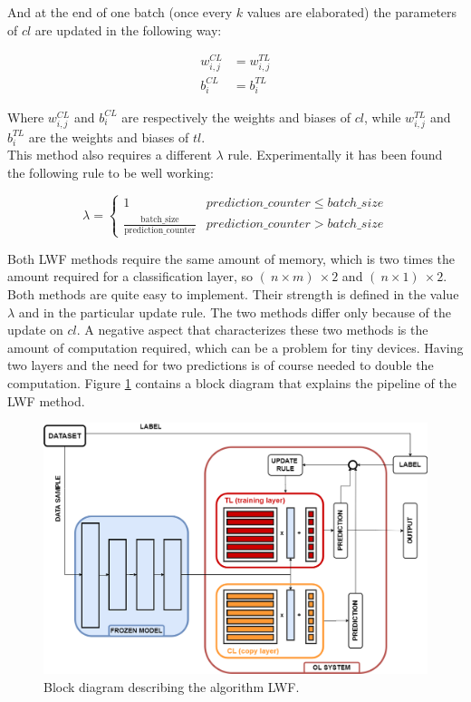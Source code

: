 \documentclass[12pt]{report}
\begin{document}
And at the end of one batch (once every $k$ values are elaborated) the parameters of $cl$ are updated in the following way:

\begin{align}
	w^{CL}_{i,j} &= w^{TL}_{i,j}  \\
	b^{CL}_i     &= b^{TL}_i  
\end{align}

Where $w^{CL}_{i,j}$ and $b^{CL}_i$ are respectively the weights and biases of $cl$, while $w^{TL}_{i,j}$ and $b^{TL}_i$ are the weights and biases of $tl$.\\
This method also requires a different $\lambda$ rule. Experimentally it has been found the following rule to be well working:

\begin{equation}
\lambda = \left\{
        		\begin{array}{ll}
            		1                                                         & prediction \_ counter \leq batch \_ size \\
            		\frac{\text{batch$\_$size}}{\text{prediction$\_$counter}} & prediction \_ counter >    batch \_ size
        		\end{array}
    		  \right.
\end{equation}

Both LWF methods require the same amount of memory, which is two times the amount required for a classification layer, so $(\ n \times m )\ \times 2$ and $(\ n \times 1 )\ \times 2$. Both methods are quite easy to implement. Their strength is defined in the value $\lambda$ and in the particular update rule. The two methods differ only because of the update on $cl$. A negative aspect that characterizes these two methods is the amount of computation required, which can be a problem for tiny devices. Having two layers and the need for two predictions is of course needed to double the computation. Figure \ref{fig:block_diag_LWF} contains a block diagram that explains the pipeline of the LWF method.

\begin{figure}[h!]
    \centering
    \includegraphics[width=120mm]{Figures/Chapter3/LWF.png} 
    \caption{Block diagram describing the algorithm LWF.}
    \label{fig:block_diag_LWF}    
\end{figure}
\end{document}
